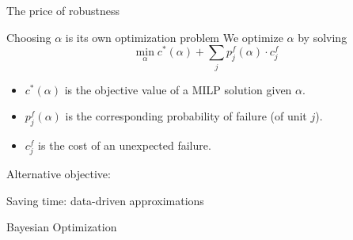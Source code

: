 \documentclass[slides]{beamer}
\begin{document}
\begin{frame}{The price of robustness}
    \centering
    
\end{frame}


\begin{frame}{Choosing $\alpha$ is its own optimization problem }
    We optimize $\alpha$ by solving
    \begin{equation*}
    \min_{\alpha} c^*(\alpha) + \sum_{j} p^f_{j}(\alpha)\cdot c_{j}^f
    \end{equation*}
    \begin{itemize}
        \item $c^*(\alpha)$ is the objective value of a MILP solution given $\alpha$.
        \item $p^f_j(\alpha)$ is the corresponding probability of failure (of
            unit $j$).
        \item $c_j^f$ is the cost of an unexpected failure.
    \end{itemize}
    Alternative objective: \citet{Li2015_2}
\end{frame}


\begin{frame}{Saving time: data-driven approximations}
\end{frame}


\begin{frame}{Bayesian Optimization}
\end{frame}
\end{document}
